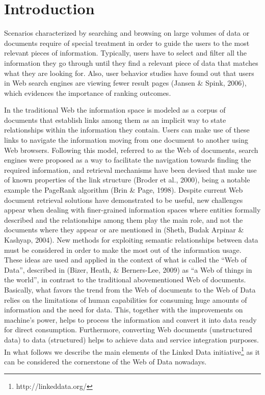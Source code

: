 \section{Introduction}\label{sec:intro}
Scenarios characterized by searching and browsing on large volumes of data or documents require of special treatment in order to guide the users to the most relevant pieces of information. Typically, users have to select and filter all the information they go through until they find a relevant piece of data that matches what they are looking for. Also, user behavior studies have found out that users in Web search engines are viewing fewer result pages (Jansen \& Spink, 2006), which evidences the importance of ranking outcomes.

In the traditional Web the information space is modeled as a corpus of documents that establish links among them as an implicit way to state relationships within the information they contain. Users can make use of these links to navigate the information moving from one document to another using Web browsers. Following this model, referred to as the Web of documents, search engines were proposed as a way to facilitate the navigation towards finding the required information, and retrieval mechanisms have been devised that make use of known properties of the link structure (Broder et al., 2000), being a notable example the PageRank algorithm (Brin \& Page, 1998). Despite current Web document retrieval solutions have demonstrated to be useful, new challenges appear when dealing with finer-grained information spaces where entities formally described and the relationships among them play the main role, and not the documents where they appear or are mentioned in (Sheth, Budak Arpinar \& Kashyap, 2004). New methods for exploiting semantic relationships between data must be considered in order to make the most out of the information usage. These ideas are used and applied in the context of what is called the “Web of Data”, described in (Bizer, Heath, \& Berners-Lee, 2009) as “a Web of things in the world”, in contrast to the traditional abovementioned Web of documents. Basically, what favors the trend from the Web of documents to the Web of Data relies on the limitations of human capabilities for consuming huge amounts of information and the need for data. This, together with the improvements on machine’s power, helps to process the information and convert it into data ready for direct consumption. Furthermore, converting Web documents (unstructured data) to data (structured) helps to achieve data and service integration purposes. In what follows we describe the main elements of the Linked Data initiative\footnote{http://linkeddata.org/} as it can be considered the cornerstone of the Web of Data nowadays.

